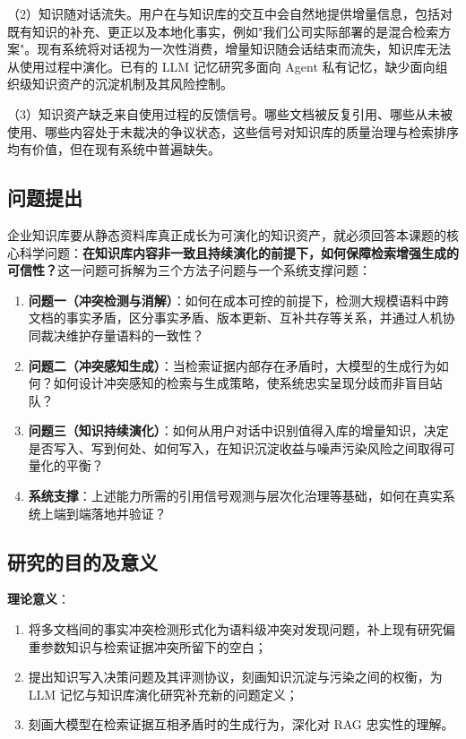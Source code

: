 （2）知识随对话流失。用户在与知识库的交互中会自然地提供增量信息，包括对既有知识的补充、更正以及本地化事实，例如"我们公司实际部署的是混合检索方案"。现有系统将对话视为一次性消费，增量知识随会话结束而流失，知识库无法从使用过程中演化。已有的 LLM 记忆研究多面向 Agent 私有记忆，缺少面向组织级知识资产的沉淀机制及其风险控制。

（3）知识资产缺乏来自使用过程的反馈信号。哪些文档被反复引用、哪些从未被使用、哪些内容处于未裁决的争议状态，这些信号对知识库的质量治理与检索排序均有价值，但在现有系统中普遍缺失。

\subsection{问题提出}

企业知识库要从静态资料库真正成长为可演化的知识资产，就必须回答本课题的核心科学问题：\textbf{在知识库内容非一致且持续演化的前提下，如何保障检索增强生成的可信性？}这一问题可拆解为三个方法子问题与一个系统支撑问题：

\begin{enumerate}
  \item \textbf{问题一（冲突检测与消解）}：如何在成本可控的前提下，检测大规模语料中跨文档的事实矛盾，区分事实矛盾、版本更新、互补共存等关系，并通过人机协同裁决维护存量语料的一致性？
  \item \textbf{问题二（冲突感知生成）}：当检索证据内部存在矛盾时，大模型的生成行为如何？如何设计冲突感知的检索与生成策略，使系统忠实呈现分歧而非盲目站队？
  \item \textbf{问题三（知识持续演化）}：如何从用户对话中识别值得入库的增量知识，决定是否写入、写到何处、如何写入，在知识沉淀收益与噪声污染风险之间取得可量化的平衡？
  \item \textbf{系统支撑}：上述能力所需的引用信号观测与层次化治理等基础，如何在真实系统上端到端落地并验证？
\end{enumerate}

\subsection{研究的目的及意义}

\textbf{理论意义}：
\begin{enumerate}
  \item 将多文档间的事实冲突检测形式化为语料级冲突对发现问题，补上现有研究偏重参数知识与检索证据冲突所留下的空白；
  \item 提出知识写入决策问题及其评测协议，刻画知识沉淀与污染之间的权衡，为 LLM 记忆与知识库演化研究补充新的问题定义；
  \item 刻画大模型在检索证据互相矛盾时的生成行为，深化对 RAG 忠实性的理解。
\end{enumerate}

